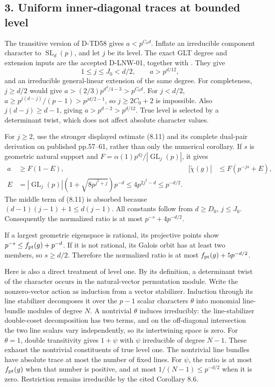 \subsection*{3. Uniform inner-diagonal traces at bounded level}

The transitive version of D-TD58 gives \(a<p^{C_0d}\).
Inflate an irreducible component character to
\(\operatorname{SL}_d(p)\), and let \(j\) be its level.
The exact GLT degree and extension inputs are the accepted
D-LNW-01, together with
\cite[Definition 2, Lemma 7.2, Theorem 7.3 and Corollary 8.6,
pp.51--53,67--68]{UNW:GLT2020}.
They give
\[
                1\le j\le J_0<d/2,\qquad a>p^{d/12},
 \tag{PFL.8}
\]
and an irreducible general-linear extension of the same degree.
For completeness, \(j\ge d/2\) would give
\(a>(2/3)p^{d^2/4-3}>p^{C_0d}\).
For \(j<d/2\), \(a\ge p^{j(d-j)}/(p-1)>
p^{jd/2-1}\), so \(j\ge2C_0+2\) is impossible.
Also \(j(d-j)\ge d-1\), giving \(a>p^{d-2}>p^{d/12}\).
True level is selected by a determinant twist, which does not
affect absolute character values.

For \(j\ge2\), use the stronger displayed estimate (8.11)
and its complete dual-pair derivation on published pp.57--61,
rather than only the numerical corollary. If \(s\) is geometric
natural support and \(F=\alpha(1)p^{dj}/|\operatorname{GL}_j(p)|\),
it gives
\[
 \begin{split}
 a&\ge F(1-E),&
 |\widetilde\chi(g)|&\le F(p^{-js}+E),\\
 E&=|\operatorname{GL}_j(p)|
       (1+\sqrt{8p^{j^2+j}})p^{-d}
       \le4p^{2j^2-d}\le p^{-d/2}.
 \end{split}
 \tag{PFL.9}
\]
The middle term of (8.11) is absorbed because
\((d-1)(j-1)+1\le d(j-1)\).
All constants follow from \(d\ge D_0\), \(j\le J_0\).
Consequently the normalized ratio is at most \(p^{-s}+4p^{-d/2}\).

If a largest geometric eigenspace is rational, its projective
points show \(p^{-s}\le f_{\rm pt}(g)+p^{-d}\).
If it is not rational, its Galois orbit has at least two members,
so \(s\ge d/2\). Therefore the normalized ratio is at most
\(f_{\rm pt}(g)+5p^{-d/2}\).

Here is also a direct treatment of level one. By its definition,
a determinant twist of the character occurs in the natural-vector
permutation module. Write the nonzero-vector action as induction
from a vector stabilizer. Induction through its line stabilizer
decomposes it over the \(p-1\) scalar characters \(\theta\) into
monomial line-bundle modules of degree \(N\). A nontrivial
\(\theta\) induces irreducibly: the line-stabilizer double-coset
decomposition has two terms, and on the off-diagonal intersection
the two line scalars vary independently, so its intertwining
space is zero. For \(\theta=1\), double transitivity gives
\(1+\psi\) with \(\psi\) irreducible of degree \(N-1\).
These exhaust the nontrivial constituents of true level one.
The nontrivial line bundles have absolute trace at most the
number of fixed lines. For \(\psi\), the ratio is at most
\(f_{\rm pt}(g)\) when that number is positive, and at most
\(1/(N-1)\le p^{-d/2}\) when it is zero.
Restriction remains irreducible by the cited Corollary 8.6.

